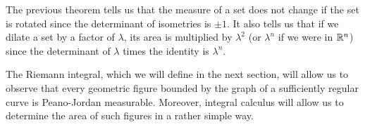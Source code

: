 The previous theorem tells us that the measure of a set does not change if the
set is rotated since the determinant of isometries is $\pm 1$. It also tells us
that if we dilate a set by a factor of $\lambda$, its area is multiplied by
$\lambda^2$ (or $\lambda^n$ if we were in ${\mathbb R}^n$) since the determinant of
$\lambda$ times the identity is $\lambda^n$.

% 
% 
% 

The Riemann integral, which we will define in the next section, will allow us to
observe that every geometric figure bounded by the graph of a sufficiently
regular curve is Peano-Jordan measurable. Moreover, integral calculus will allow
us to determine the area of such figures in a rather simple way.